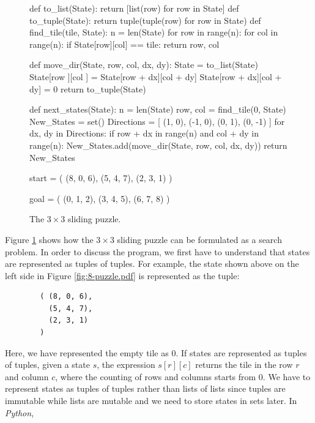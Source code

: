 \begin{figure}[!ht]
\centering
\begin{python3code}
    def to_list(State):
        return [list(row) for row in State]
    def to_tuple(State):
        return tuple(tuple(row) for row in State)
    def find_tile(tile, State):
        n = len(State)
        for row in range(n):
            for col in range(n):
                if State[row][col] == tile:
                    return row, col
    
    def move_dir(State, row, col, dx, dy):
        State = to_list(State)
        State[row     ][col     ] = State[row + dx][col + dy]
        State[row + dx][col + dy] = 0
        return to_tuple(State)
    
    def next_states(State):
        n          = len(State)
        row, col   = find_tile(0, State)
        New_States = set()
        Directions = [ (1, 0), (-1, 0), (0, 1), (0, -1) ]
        for dx, dy in Directions:
            if row + dx in range(n) and col + dy in range(n):
                New_States.add(move_dir(State, row, col, dx, dy))
        return New_States
    
    start = ( (8, 0, 6),
              (5, 4, 7),
              (2, 3, 1)
            )

    goal = ( (0, 1, 2), 
             (3, 4, 5), 
             (6, 7, 8)
           )
\end{python3code}
\vspace*{-0.3cm}
\caption{The $3 \times 3$ sliding puzzle.}
\label{fig:Sliding-Puzzle.ipynb}
\end{figure}
Figure \ref{fig:Sliding-Puzzle.ipynb} shows how the $3 \times 3$ sliding puzzle can be formulated as
a search problem.  In order to discuss the program, we first have to understand that states are
represented as tuples of tuples.  For example, the state shown above on the left side in Figure
\ref{fig:8-puzzle.pdf} is represented as the tuple:
\begin{verbatim}
        ( (8, 0, 6),
          (5, 4, 7),
          (2, 3, 1)
        )
\end{verbatim}
Here, we have represented the empty tile as $0$.
If states are represented as tuples of tuples, given a state $s$, the expression $s[r][c]$ returns the tile in
the row $r$ and column $c$, where the counting of rows and columns starts from $0$.
We have to represent states as tuples of tuples rather than lists of lists since
tuples are immutable while lists are mutable and we need to store states in sets later.  In \textsl{Python},

